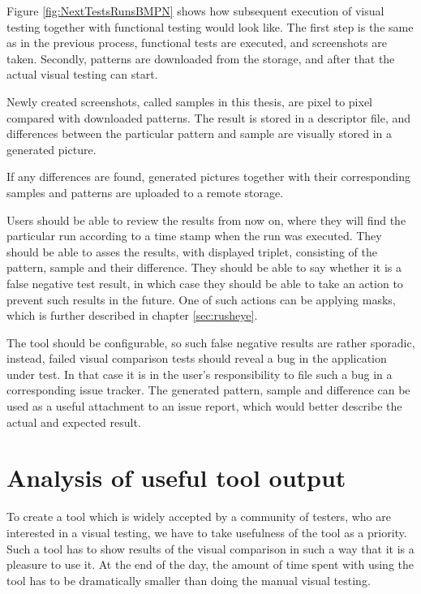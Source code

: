 \documentclass[11pt,oneside,final]{fithesis2}
\begin{document}
  Figure \ref{fig:NextTestsRunsBMPN} shows how subsequent execution of visual testing together with functional testing would look like. The first step is the same as in the previous process,
  functional tests are executed, and screenshots are taken. Secondly, patterns are downloaded from the storage, and after that the actual visual testing can start.
  
  Newly created screenshots, called samples in this thesis, are pixel to pixel compared with downloaded patterns. The result is stored in a descriptor file, and differences between the 
  particular pattern and sample are visually stored in a generated picture.
  
  If any differences are found, generated pictures together with their corresponding samples and patterns are uploaded to a remote storage.
  
  Users should be able to review the results from now on, where they will find the particular run according to a time stamp when the run was executed. They should be able to asses the results,
  with displayed triplet, consisting of the pattern, sample and their difference. They should be able to say whether it is a false negative test result, in which case they should be able to 
  take an action to prevent such results in the future. One of such actions can be applying masks, which is further described in chapter \ref{sec:rusheye}.
  
  The tool should be configurable, so such false negative results are rather sporadic, instead, failed visual comparison tests should reveal a bug in the application under test. In that case
  it is in the user's responsibility to file such a bug in a corresponding issue tracker. The generated pattern, sample and difference can be used as a useful attachment to an issue report, which
  would better describe the actual and expected result.
  
  \newpage
  \section{Analysis of useful tool output}
  \label{sec:analysisUsefulOutput}
  To create a tool which is widely accepted by a community of testers, who are interested in a visual testing, we have to take usefulness of the tool as a priority. Such a tool has to show results
  of the visual comparison in such a way that it is a pleasure to use it. At the end of the day, the amount of time spent with using the tool has to be dramatically smaller than doing the manual
  visual testing.
   
\end{document}
